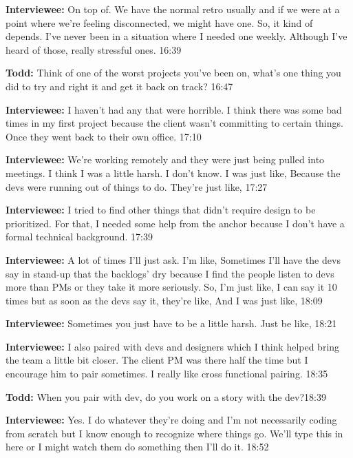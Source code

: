 \textbf{Interviewee:} On top of. We have the normal retro usually and if we were at a point where we're feeling disconnected, we might have one. So, it kind of depends. I've never been in a situation where I needed one weekly. Although I've heard of those, really stressful ones. 16:39

\textbf{Todd:} Think of one of the worst projects you've been on, what's one thing you did to try and right it and get it back on track? 16:47

\textbf{Interviewee:} I haven't had any that were horrible. I think there was some bad times in my first project because the client wasn't committing to certain things. Once they went back to their own office. 17:10

\textbf{Interviewee:} We're working remotely and they were just being pulled into meetings. I think I was a little harsh. I don't know. I was just like,  Because the devs were running out of things to do. They're just like,  17:27

\textbf{Interviewee:} I tried to find other things that didn't require design to be prioritized. For that, I needed some help from the anchor because I don't have a formal technical background. 17:39

\textbf{Interviewee:} A lot of times I'll just ask. I'm like,  Sometimes I'll have the devs say in stand-up that the backlogs' dry because I find the people listen to devs more than PMs or they take it more seriously. So, I'm just like,  I can say it 10 times but as soon as the devs say it, they're like,  And I was just like,  18:09

\textbf{Interviewee:} Sometimes you just have to be a little harsh. Just be like,  18:21

\textbf{Interviewee:} I also paired with devs and designers which I think helped bring the team a little bit closer. The client PM was there half the time but I encourage him to pair sometimes. I really like cross functional pairing. 18:35

\textbf{Todd:} When you pair with dev, do you work on a story with the dev?18:39

\textbf{Interviewee:} Yes. I do whatever they're doing and I'm not necessarily coding from scratch but I know enough to recognize where things go. We'll type this in here or I might watch them do something then I'll do it. 18:52

